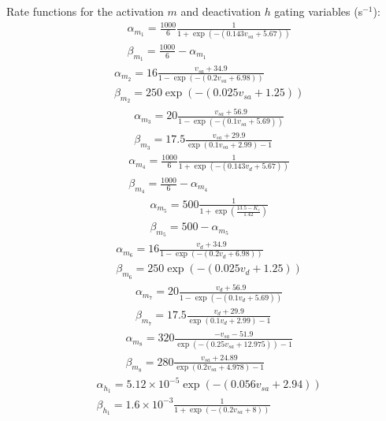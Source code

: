 \documentclass[11pt]{elsarticle}
\newcommand{\psec}{s$^{-1}$\xspace}
\begin{document}
%
Rate functions for the activation $m$ and deactivation $h$ gating variables (\psec):
	\begin{align}
	&\alpha_{m_1} = \frac{1000}{6}\frac{1}{ 1 + \exp(- (0.143 v_{sa} + 5.67))  } \\
	&\beta_{m_1} = \frac{1000}{6} - \alpha_{m_1}
	\end{align}
	\begin{align}
	&\alpha_{m_2} = 16 \frac{v_{sa} + 34.9}{1 - \exp(-(0.2 v_{sa} + 6.98))} \\
	&\beta_{m_2} = 250 \exp(-(0.025 v_{sa} + 1.25))
	\end{align}
	\begin{align}
	&\alpha_{m_3} = 20 \frac{v_{sa} + 56.9}{1 - \exp(-(0.1 v_{sa} + 5.69))} \\
	&\beta_{m_3} = 17.5 \frac{v_{sa} + 29.9}{\exp(0.1 v_{sa} + 2.99) - 1}
	\end{align}
	\begin{align}
	&\alpha_{m_4} = \frac{1000}{6} \frac{1}{ 1 + \exp(- (0.143 v_{d} + 5.67)) } \\
	&\beta_{m_4} = \frac{1000}{6} - \alpha_{m_4}
	\end{align}
	\begin{align}
	&\alpha_{m_5} = 500 \frac{1}{1 + \exp(\frac{13.5 - K_e}{1.42})} \\
	&\beta_{m_5} = 500 - \alpha_{m_5}
	\end{align}
	\begin{align}
	&\alpha_{m_6} = 16 \frac{v_{d} + 34.9}{1 - \exp(-(0.2 v_{d} + 6.98))} \\
	&\beta_{m_6} = 250 \exp(-(0.025 v_{d} + 1.25))
	\end{align}
	\begin{align}
	&\alpha_{m_7} = 20 \frac{v_{d} + 56.9}{1 - \exp(-(0.1 v_{d} + 5.69))} \\
	&\beta_{m_7} = 17.5 \frac{v_{d} + 29.9}{\exp(0.1 v_{d} + 2.99) - 1}
	\end{align}
	\begin{align}
	&\alpha_{m_8} = 320 \frac{-v_{sa} - 51.9}{\exp(-(0.25 v_{sa} + 12.975)) - 1} \\
	&\beta_{m_8} = 280 \frac{v_{sa} + 24.89}{\exp(0.2 v_{sa} + 4.978) - 1} 
	\end{align}
	\begin{align}
	&\alpha_{h_1} = 5.12 \times 10^{-5} \exp(-(0.056 v_{sa} + 2.94)) \\
	&\beta_{h_1} = 1.6 \times 10^{-3} \frac{1}{1 + \exp(-(0.2 v_{sa} + 8))}
	\end{align}
\end{document}
